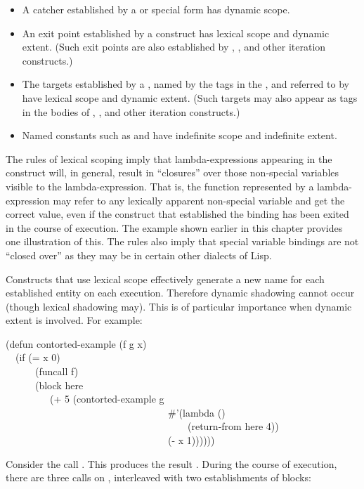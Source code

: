 \begin{itemize}
\item
A catcher established by a 
or  special form has dynamic
scope.

\item
An exit point established by a  construct has lexical
scope and dynamic extent.  (Such exit points are also established
by , , and other iteration constructs.)

\item
The  targets
established by a , named by the tags in the ,
and referred to by 
have lexical scope and dynamic extent.  (Such  targets
may also appear as tags in the bodies of
, , and other iteration constructs.)

\item
Named constants such as  and  have indefinite
scope and indefinite extent.
\end{itemize}

The rules of lexical scoping imply that lambda-expressions
appearing in the  construct will,
in general, result in ``closures''
over those non-special variables visible to the lambda-expression.
That is, the function represented by a lambda-expression
may refer to any lexically apparent non-special variable and get the
correct value, even if the construct that established the binding
has been exited in the course of execution.
The  example shown earlier in this chapter
provides one illustration of this.
The rules also imply that special variable bindings are not
``closed over'' as they may be in certain other dialects of Lisp.

Constructs that use lexical scope effectively
generate a new name for each established entity on each execution.
Therefore dynamic shadowing cannot occur (though lexical shadowing may).
This is of particular importance when dynamic extent is involved.
For example:

\begin{lisp}
(defun contorted-example (f g x) \\
~~(if (= x 0) \\
~~~~~~(funcall f) \\
~~~~~~(block here \\
~~~~~~~~~(+ 5 (contorted-example g \\
~~~~~~~~~~~~~~~~~~~~~~~~~~~~~~~~~\#'(lambda () \\
~~~~~~~~~~~~~~~~~~~~~~~~~~~~~~~~~~~~~(return-from here 4)) \\
~~~~~~~~~~~~~~~~~~~~~~~~~~~~~~~~~(- x 1))))))
\end{lisp}
Consider the call .  This produces
the result .  During the course of execution, there are three
calls on , interleaved with two establishments
of blocks:

